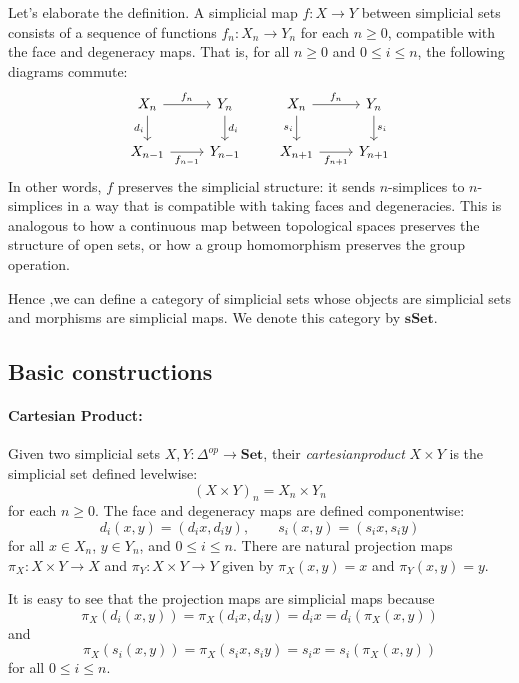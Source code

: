 \documentclass[11pt]{article}
\theoremstyle{definition}
\theoremstyle{plain}
\begin{document}
Let's elaborate the definition. A simplicial map $f : X \to Y$ between simplicial sets consists of a sequence of functions $f_n : X_n \to Y_n$ for each $n \geq 0$, compatible with the face and degeneracy maps. That is, for all $n \geq 0$ and $0 \leq i \leq n$, the following diagrams commute:
\[
    \begin{tikzcd}
        X_n \arrow[r,"f_n"] \arrow[d,"d_i"'] & Y_n \arrow[d,"d_i"] \\
        X_{n-1} \arrow[r,"f_{n-1}"'] & Y_{n-1}
    \end{tikzcd}
    \qquad
    \begin{tikzcd}
        X_n \arrow[r,"f_n"] \arrow[d,"s_i"'] & Y_n \arrow[d,"s_i"] \\
        X_{n+1} \arrow[r,"f_{n+1}"'] & Y_{n+1}
    \end{tikzcd}
\]
In other words, $f$ preserves the simplicial structure: it sends $n$-simplices to $n$-simplices in a way that is compatible with taking faces and degeneracies. This is analogous to how a continuous map between topological spaces preserves the structure of open sets, or how a group homomorphism preserves the group operation.


Hence ,we can define a category of simplicial sets whose objects are simplicial sets and morphisms are simplicial maps. We denote this category by $\mathbf{sSet}$.


\subsection{Basic constructions}
\paragraph{\textbf{Cartesian Product:}}
Given two simplicial sets $X, Y : \Delta^{op} \to \mathbf{Set}$, their \emph{cartesianproduct} $X \times Y$ is the simplicial set defined levelwise:
\[
    (X \times Y)_n = X_n \times Y_n
\]
for each $n \geq 0$. The face and degeneracy maps are defined componentwise:
\[
    d_i(x, y) = (d_i x, d_i y), \qquad s_i(x, y) = (s_i x, s_i y)
\]
for all $x \in X_n$, $y \in Y_n$, and $0 \leq i \leq n$.
There are natural projection maps $\pi_X : X \times Y \to X$ and $\pi_Y : X \times Y \to Y$  given by $\pi_X(x, y) = x$ and $\pi_Y(x, y) = y$.

It is easy to see that the projection maps are simplicial maps because
\[
    \pi_X (d_i (x,y)) = \pi_X (d_i x, d_i y) = d_i x = d_i ( \pi_X (x,y))
\]
and
\[
    \pi_X (s_i (x,y)) = \pi_X (s_i x, s_i y) = s_i x = s_i ( \pi_X (x,y))
\]
for all $0 \leq i \leq n$.
\end{document}
